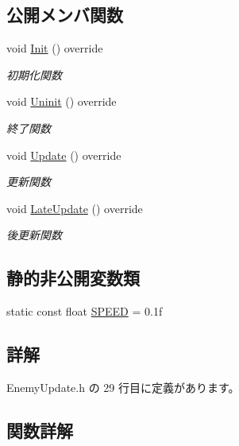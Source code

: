 \subsection*{公開メンバ関数}
\begin{DoxyCompactItemize}
\item 
void \mbox{\hyperlink{class_enemy_update_a5b68696e964f71fca73c9143e3770c9d}{Init}} () override
\begin{DoxyCompactList}\small\item\em 初期化関数 \end{DoxyCompactList}\item 
void \mbox{\hyperlink{class_enemy_update_a294a5d4c65551af43e933cb65036f279}{Uninit}} () override
\begin{DoxyCompactList}\small\item\em 終了関数 \end{DoxyCompactList}\item 
void \mbox{\hyperlink{class_enemy_update_ae9662f3a2d064dc69c0d68293e60f051}{Update}} () override
\begin{DoxyCompactList}\small\item\em 更新関数 \end{DoxyCompactList}\item 
void \mbox{\hyperlink{class_enemy_update_ae14e4ebb42ad9043534e53edcba5b242}{Late\+Update}} () override
\begin{DoxyCompactList}\small\item\em 後更新関数 \end{DoxyCompactList}\end{DoxyCompactItemize}
\subsection*{静的非公開変数類}
\begin{DoxyCompactItemize}
\item 
static const float \mbox{\hyperlink{class_enemy_update_a339b9c72d3144781291bc333dc0c971f}{S\+P\+E\+ED}} = 0.\+1f
\end{DoxyCompactItemize}


\subsection{詳解}


 Enemy\+Update.\+h の 29 行目に定義があります。



\subsection{関数詳解}
\mbox{\label{class_enemy_update_a5b68696e964f71fca73c9143e3770c9d}} 
